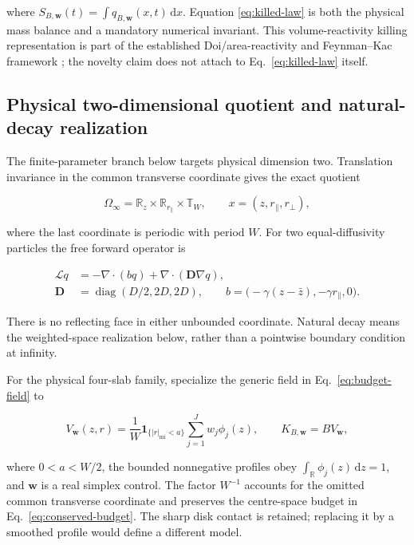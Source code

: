 \documentclass[aps,physrev,reprint,amsmath,amssymb,longbibliography,floatfix]{revtex4-2}
\newcommand{\dd}{\mathrm d}
\begin{document}
where $S_{B,\bm w}(t)=\int q_{B,\bm w}(x,t)\,\dd x$.  Equation
\eqref{eq:killed-law} is both the physical mass balance and a mandatory
numerical invariant.  This volume-reactivity killing representation is part of
the established Doi/area-reactivity and Feynman--Kac framework
\cite{isaacsonMauroNewby2016uniform,pruestelMeierSchellersheim2014area,
bressloff2022feynmanKac}; the novelty claim does not attach to
Eq.~\eqref{eq:killed-law} itself.

\subsection{Physical two-dimensional quotient and natural-decay realization}
\label{sec:d2-natural-decay}

The finite-parameter branch below targets physical dimension two.  Translation
invariance in the common transverse coordinate gives the exact quotient

\begin{equation}
 \Omega_\infty
 =\mathbb R_z\times\mathbb R_{r_\parallel}\times\mathbb T_W,
 \qquad x=(z,r_\parallel,r_\perp),
 \label{eq:d2-unbounded-quotient}
\end{equation}

where the last coordinate is periodic with period $W$.  For two
equal-diffusivity particles the free forward operator is

\begin{align}
 \mathcal Lq&=-\nabla\!\cdot(bq)
              +\nabla\!\cdot(\bm D\nabla q),\nonumber\\
 \bm D&=\operatorname{diag}(D/2,2D,2D),\qquad
 b=\bigl(-\gamma(z-\bar z),-\gamma r_\parallel,0\bigr).
 \label{eq:d2-free-generator}
\end{align}

There is no reflecting face in either unbounded coordinate.  Natural decay
means the weighted-space realization below, rather than a pointwise boundary
condition at infinity.

For the physical four-slab family, specialize the generic field in
Eq.~\eqref{eq:budget-field} to

\begin{equation}
 V_{\bm w}(z,r)
 =\frac{1}{W}\bm1_{\{|r|_{\mathrm{mi}}<a\}}
   \sum_{j=1}^{J}w_j\phi_j(z),
 \qquad K_{B,\bm w}=B V_{\bm w},
 \label{eq:d2-sharp-killing}
\end{equation}

where $0<a<W/2$, the bounded nonnegative profiles obey
$\int_{\mathbb R}\phi_j(z)\,\dd z=1$, and $\bm w$ is a real simplex
control.  The factor $W^{-1}$ accounts for the omitted common transverse
coordinate and preserves the centre-space budget in
Eq.~\eqref{eq:conserved-budget}.  The sharp disk contact is retained; replacing
it by a smoothed profile would define a different model.
\end{document}
